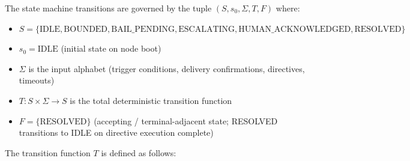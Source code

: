 The state machine transitions are governed by the tuple $(S, s_0, \Sigma, T, F)$ where:
\begin{itemize}
  \item $S = \{\text{IDLE}, \text{BOUNDED}, \text{BAIL\_PENDING}, \text{ESCALATING}, \text{HUMAN\_ACKNOWLEDGED}, \text{RESOLVED}\}$
  \item $s_0 = \text{IDLE}$ (initial state on node boot)
  \item $\Sigma$ is the input alphabet (trigger conditions, delivery confirmations, directives, timeouts)
  \item $T: S \times \Sigma \rightarrow S$ is the total deterministic transition function
  \item $F = \{\text{RESOLVED}\}$ (accepting / terminal-adjacent state; RESOLVED transitions to IDLE on directive execution complete)
\end{itemize}

\bigskip
\noindent The transition function $T$ is defined as follows:

